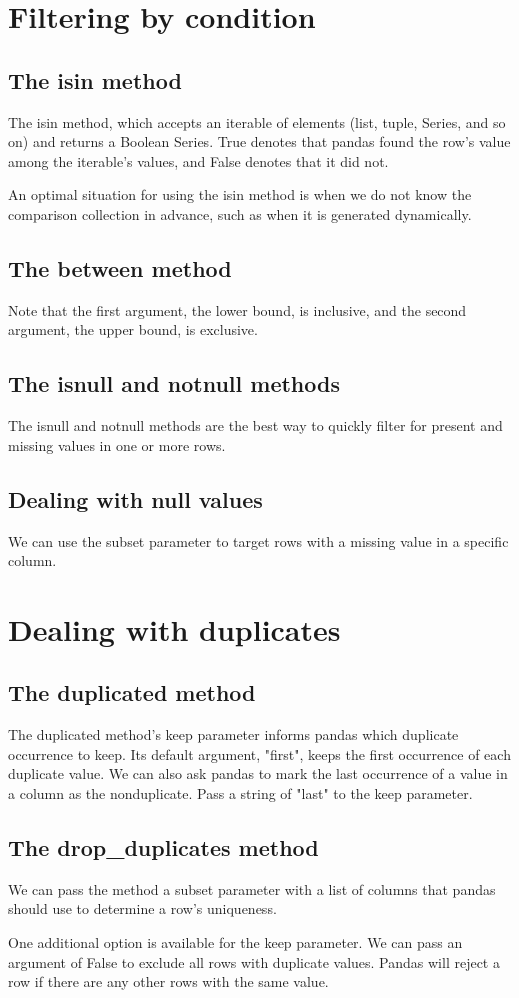 \section{Filtering by condition}
\subsection{The isin method}
The isin method, which accepts an iterable of elements (list, tuple, Series, and so on) and returns a Boolean Series. True denotes that pandas found the row’s value among the iterable’s values, and False denotes that it did not.

An optimal situation for using the isin method is when we do not know the comparison collection in advance, such as when it is generated dynamically.
\subsection{The between method}
Note that the first argument, the lower bound, is inclusive, and the second argument, the upper bound, is exclusive.
\subsection{The isnull and notnull methods}
The isnull and notnull methods are the best way to quickly filter for present and missing values in one or more rows.
\subsection{Dealing with null values}
We can use the subset parameter to target rows with a missing value in a specific column.
\section{Dealing with duplicates}
\subsection{The duplicated method}
The duplicated method’s keep parameter informs pandas which duplicate occurrence to keep. Its default argument, "first", keeps the first occurrence of each duplicate value. We can also ask pandas to mark the last occurrence of a value in a column as the nonduplicate. Pass a string of "last" to the keep parameter.
\subsection{The drop\_duplicates method}
We can pass the method a subset parameter with a list of columns that pandas should use to determine a row’s uniqueness.

One additional option is available for the keep parameter. We can pass an argument of False to exclude all rows with duplicate values. Pandas will reject a row if there are any other rows with the same value.